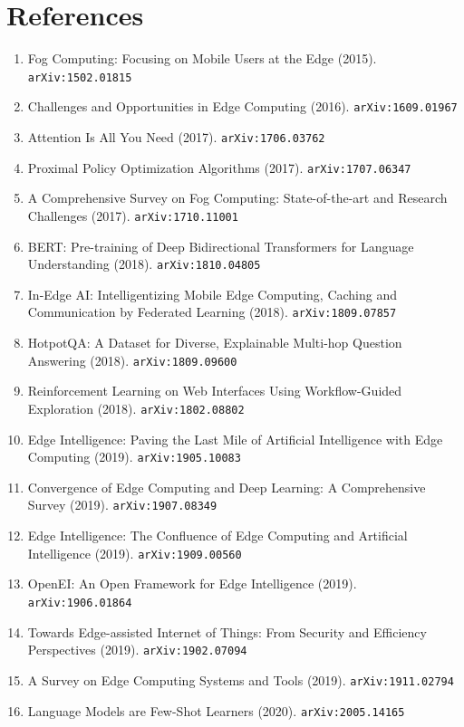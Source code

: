 \documentclass[11pt]{article}
\begin{document}
\section*{References}
\begin{enumerate}\small
  \item Fog Computing: Focusing on Mobile Users at the Edge (2015). \texttt{arXiv:1502.01815}
  \item Challenges and Opportunities in Edge Computing (2016). \texttt{arXiv:1609.01967}
  \item Attention Is All You Need (2017). \texttt{arXiv:1706.03762}
  \item Proximal Policy Optimization Algorithms (2017). \texttt{arXiv:1707.06347}
  \item A Comprehensive Survey on Fog Computing: State-of-the-art and Research
  Challenges (2017). \texttt{arXiv:1710.11001}
  \item BERT: Pre-training of Deep Bidirectional Transformers for Language
  Understanding (2018). \texttt{arXiv:1810.04805}
  \item In-Edge AI: Intelligentizing Mobile Edge Computing, Caching and
  Communication by Federated Learning (2018). \texttt{arXiv:1809.07857}
  \item HotpotQA: A Dataset for Diverse, Explainable Multi-hop Question
  Answering (2018). \texttt{arXiv:1809.09600}
  \item Reinforcement Learning on Web Interfaces Using Workflow-Guided
  Exploration (2018). \texttt{arXiv:1802.08802}
  \item Edge Intelligence: Paving the Last Mile of Artificial Intelligence with
  Edge Computing (2019). \texttt{arXiv:1905.10083}
  \item Convergence of Edge Computing and Deep Learning: A Comprehensive Survey (2019). \texttt{arXiv:1907.08349}
  \item Edge Intelligence: The Confluence of Edge Computing and Artificial
  Intelligence (2019). \texttt{arXiv:1909.00560}
  \item OpenEI: An Open Framework for Edge Intelligence (2019). \texttt{arXiv:1906.01864}
  \item Towards Edge-assisted Internet of Things: From Security and Efficiency
  Perspectives (2019). \texttt{arXiv:1902.07094}
  \item A Survey on Edge Computing Systems and Tools (2019). \texttt{arXiv:1911.02794}
  \item Language Models are Few-Shot Learners (2020). \texttt{arXiv:2005.14165}

\end{enumerate}
\end{document}
